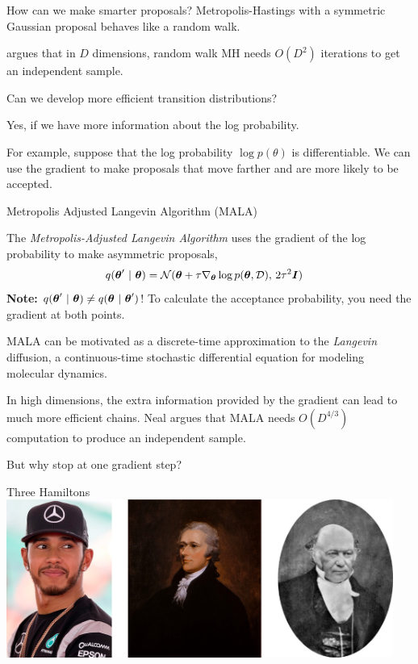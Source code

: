 \documentclass[aspectratio=169]{beamer}
\begin{document}
\begin{frame}{How can we make smarter proposals?}
    Metropolis-Hastings with a symmetric Gaussian proposal behaves like a random walk.
    
    \citet{Neal2012-ev} argues that in $D$ dimensions, random walk MH needs $O(D^2)$ iterations to get an independent sample. 
    
    Can we develop more efficient transition distributions?
    
    Yes, if we have more information about the log probability. 
    
    For example, suppose that the log probability $\log p(\theta)$ is differentiable. We can use the gradient to make proposals that move farther and are more likely to be accepted.
\end{frame}


\begin{frame}{Metropolis Adjusted Langevin Algorithm (MALA)}

The \textit{Metropolis-Adjusted Langevin Algorithm} uses the gradient of the log probability to make asymmetric proposals,
\begin{align}
    q(\boldsymbol{\theta}' ~\vert~ \boldsymbol{\theta}) &= \mathcal{N}(\boldsymbol{\theta} + \tau \nabla_{\boldsymbol{\theta}} \log p(\boldsymbol{\theta}, \mathcal{D}), \, 2\tau^2 \boldsymbol{I}) 
\end{align}
\textbf{Note:} $q(\boldsymbol{\theta}' ~\vert~ \boldsymbol{\theta}) \neq q(\boldsymbol{\theta} ~\vert~ \boldsymbol{\theta}')$! To calculate the acceptance probability, you need the gradient at both points.

MALA can be motivated as a discrete-time approximation to the \textit{Langevin} diffusion, a continuous-time stochastic differential equation for modeling molecular dynamics.

In high dimensions, the extra information provided by the gradient can lead to much more efficient chains. Neal argues that MALA needs $O(D^{4/3})$ computation to produce an independent sample.

But why stop at one gradient step?

\end{frame}


\begin{frame}{Three Hamiltons}
\centering
\includegraphics[width=0.95\textwidth]{figures/lap3/hamiltons.png}
\end{frame}
\end{document}
